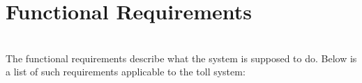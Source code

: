 \section{Functional Requirements} \pawel \\
The functional requirements describe what the system is supposed to do. Below is a list of such requirements applicable to the toll system:
